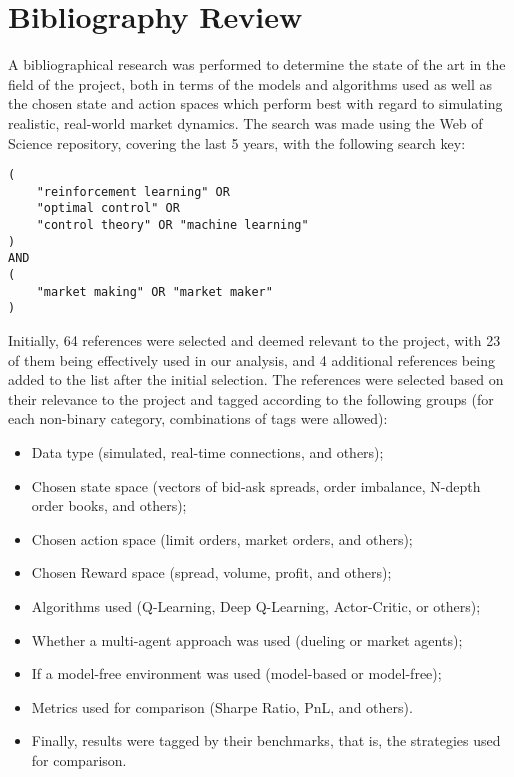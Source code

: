 \section{Bibliography Review}
\label{sec:bibliography-review}

A bibliographical research was performed to determine the state of the art in the field of the project,
both in terms of the models and algorithms used as well as the chosen state and action spaces which perform best
with regard to simulating realistic, real-world market dynamics.
The search was made using the Web of Science repository, covering the last 5 years, with the following search key:

\begin{verbatim}
(
    "reinforcement learning" OR
    "optimal control" OR
    "control theory" OR "machine learning"
)
AND
(
    "market making" OR "market maker"
)
\end{verbatim}

Initially, 64 references were selected and deemed relevant to the project,
with 23 of them being effectively used in our analysis, and 4 additional references being added to the list after the initial selection.
The references were selected based on their relevance to the project and tagged according to the following groups
(for each non-binary category, combinations of tags were allowed):

\begin{itemize}
    \item Data type (simulated, real-time connections, and others);
    \item Chosen state space (vectors of bid-ask spreads, order imbalance, N-depth order books, and others);
    \item Chosen action space (limit orders, market orders, and others);
    \item Chosen Reward space (spread, volume, profit, and others);
    \item Algorithms used (Q-Learning, Deep Q-Learning, Actor-Critic, or others);
    \item Whether a multi-agent approach was used (dueling or market agents);
    \item If a model-free environment was used (model-based or model-free);
    \item Metrics used for comparison (Sharpe Ratio, PnL, and others).
    \item Finally, results were tagged by their benchmarks, that is, the strategies used for comparison.
\end{itemize}

